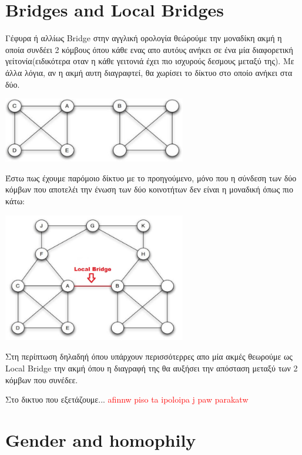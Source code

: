 \documentclass[12pt]{article}
\begin{document}
	
	\newpage
	\section{Bridges and Local Bridges}
	Γέφυρα ή αλλίως Bridge στην αγγλική ορολογία θεώρούμε την μοναδίκη ακμή η οποία συνδέει 2 κόμβους όπου κάθε ενας απο αυτόυς ανήκει σε ένα μία διαφορετική γείτονία(ειδικότερα οταν η κάθε γειτονιά έχει πιο ισχυρούς δεσμους μεταξύ της). Με άλλα λόγια, αν η ακμή αυτη διαγραφτεί, θα χωρίσει το δίκτυο στο οποίο ανήκει στα δύο.
	\begin{center}
		\includegraphics[width=0.6\textwidth]{photos-files/section9/bridge_example.jpg}
	\end{center}
	\vspace{12pt}
	Έστω πως έχουμε παρόμοιο δίκτυο με το προηγούμενο, μόνο που η σύνδεση των δύο κόμβων που αποτελέι την ένωση των δύο κοινοτήτων δεν είναι η μοναδική όπως πιο κάτω:
	\begin{center}
		\includegraphics[width=0.6\textwidth]{photos-files/section9/local_bridge_example.jpg}
	\end{center}
	\vspace{12pt}
	Στη περίπτωση δηλαδηή όπου υπάρχουν περισσότερρες απο μία ακμές θεωρούμε ως Local Bridge την ακμή όπου η διαγραφή της θα αυξήσει την απόσταση μεταξύ των 2 κόμβων που συνέδεε.
	
	\newpage
	Στο δικτυο που εξετάζουμε... \textcolor{red}{afinnw piso ta ipoloipa j paw parakatw}
	\label{chap:bridges_and_local_bridges_9}
	
	
	
	\newpage
	\section{Gender and homophily}
	\label{chap:gender_and_homophily_10}
	
\end{document}
